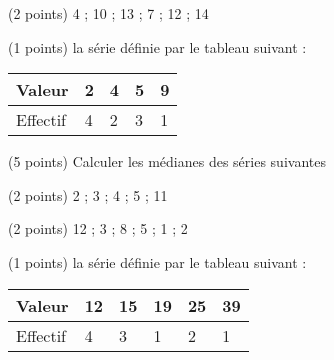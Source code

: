\cnt (2 points) 4 ; 10 ; 13 ; 7 ; 12 ; 14

\cnt (1 points) la série définie par le tableau suivant :

\begin{tabularx}{\textwidth}{Y*{4}{|Y}}
    Valeur &  2 & 4 & 5 & 9\\ \hline
    Effectif & 4 & 2 & 3 & 1
\end{tabularx} 

\exrc (5 points) Calculer les médianes des séries suivantes

\cnt (2 points) 2 ; 3 ; 4 ; 5 ; 11

\cnt (2 points) 12 ; 3 ; 8 ; 5 ; 1 ; 2

\cnt (1 points) la série définie par le tableau suivant :

\begin{tabularx}{\textwidth}{Y*{5}{|Y}}
    Valeur &  12 & 15  & 19 & 25 & 39\\ \hline
    Effectif & 4 & 3 & 1 & 2 & 1
\end{tabularx} 